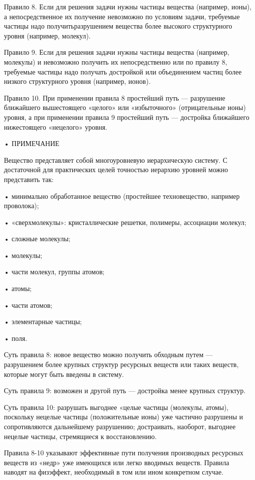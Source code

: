 Правило 8. Если  для решения задачи нужны  частицы вещества (например,
ионы), а непосредственное их  получение невозможно по условиям задачи,
требуемые  частицы надо  получитьразрушением  вещества более  высокого
структурного уровня (например, молекул).

Правило 9. Если  для решения задачи нужны  частицы вещества (например,
молекулы) и невозможно  получить их непосредственно или  по правилу 8,
требуемые  частицы надо  получать достройкой  или объединением  частиц
более низкого структурного уровня (например, ионов).

Правило  10. При  применении правила  8 простейший  путь —  разрушение
ближайшего  вышестоящего  «целого»  или  «избыточного»  (отрицательные
ионы) уровня, а  при применении правила 9 простейший  путь — достройка
ближайшего нижестоящего «нецелого» уровня.

• ПРИМЕЧАНИЕ

Вещество  представляет собой  многоуровневую иерархическую  систему. С
достаточной для  практических целей  точностью иерархию  уровней можно
представить так:

• минимально обработанное вещество (простейшее техновещество, например
проволока);

•  «сверхмолекулы»:  кристаллические   решетки,  полимеры,  ассоциации
молекул;

• сложные молекулы;

• молекулы;

• части молекул, группы атомов;

• атомы;

• части атомов;

• элементарные частицы;

• поля.

Суть  правила  8:  новое  вещество можно  получить  обходным  путем  —
разрушением  более  крупных  структур   ресурсных  веществ  или  таких
веществ, которые могут быть введены в систему.

Суть  правила 9:  возможен и  другой  путь —  достройка менее  крупных
структур.

Суть правила 10: разрушать  выгоднее «целые частицы (молекулы, атомы),
поскольку нецелые частицы (положительные  ионы) уже частично разрушены
и  сопротивляются   дальнейшему  разрушению;   достраивать,  наоборот,
выгоднее нецелые частицы, стремящиеся к восстановлению.

Правила   8-10  указывают   эффективные  пути   получения  производных
ресурсных веществ из «недр» уже  имеющихся или легко вводимых веществ.
Правила наводят  на физэффект, необходимый  в том или  ином конкретном
случае.


